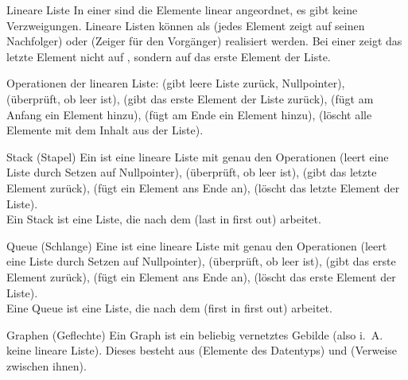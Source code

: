 \begin{Def}{Lineare Liste}
    In einer  sind die Elemente linear angeordnet, es
    gibt keine Verzweigungen. Lineare Listen können als 
    (jedes Element zeigt auf seinen Nachfolger) oder  (Zeiger für den Vorgänger) realisiert werden.
    Bei einer  zeigt das letzte Element nicht auf
    , sondern auf das erste Element der Liste.

    Operationen der linearen Liste:
     (gibt leere Liste zurück, Nullpointer),\\
     (überprüft, ob  leer ist),
     (gibt das erste Element der Liste zurück),
     (fügt am Anfang ein Element hinzu),
     (fügt am Ende ein Element hinzu),
     (löscht alle Elemente mit dem Inhalt aus der Liste).
\end{Def}

\begin{Def}{Stack (Stapel)}
    Ein  ist eine lineare Liste mit genau den Operationen
     (leert eine Liste durch Setzen auf Nullpointer),
     (überprüft, ob  leer ist),
     (gibt das letzte Element zurück),
     (fügt ein Element ans Ende an),
     (löscht das letzte Element der Liste). \\
    Ein Stack ist eine Liste, die nach dem 
    (last in first out) arbeitet.
\end{Def}

\begin{Def}{Queue (Schlange)}
    Eine  ist eine lineare Liste mit genau den Operationen
     (leert eine Liste durch Setzen auf Nullpointer),
     (überprüft, ob  leer ist),
     (gibt das erste Element zurück),
     (fügt ein Element ans Ende an),
     (löscht das erste Element der Liste). \\
    Eine Queue ist eine Liste, die nach dem 
    (first in first out) arbeitet.
\end{Def}

\begin{Def}{Graphen (Geflechte)}
    Ein Graph ist ein beliebig vernetztes Gebilde (also i.~A. keine lineare
    Liste). Dieses besteht aus  (Elemente des Datentyps) und
     (Verweise zwischen ihnen).
\end{Def}

